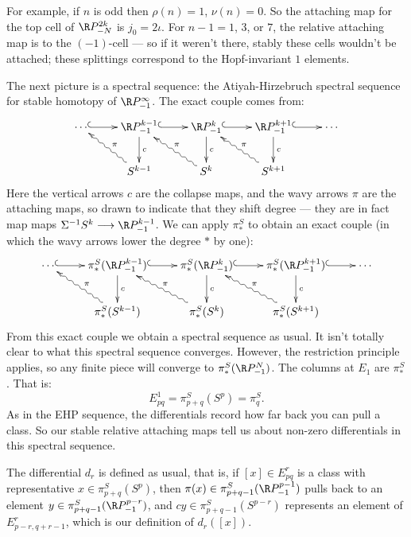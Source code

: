 For example, if $n$ is odd then $\rho(n) = 1$, $\nu(n) = 0$.  So the attaching map for the top cell of $\RP^{2k}_{-N}$ is $j_0 = 2\iota$.  For $n-1 = 1$, $3$, or $7$, the relative attaching map is to the $(-1)$-cell --- so if it weren't there, stably these cells wouldn't be attached; these splittings correspond to the Hopf-invariant $1$ elements.

The next picture is a spectral sequence: the Atiyah-Hirzebruch spectral sequence for stable homotopy of $\RP^\infty_{-1}$.  The exact couple comes from:
\[\xymatrix{
\cdots\ar@{^{(}->}[r]&\RP^{k-1}_{-1}\ar@{^{(}->}[r]\ar[d]^{c}&\RP^{k}_{-1}\ar@{^{(}->}[r]\ar[d]^{c}&\RP^{k+1}_{-1}\ar@{^{(}->}[r]\ar[d]^{c}&\cdots\\
&S^{k-1}\ar@{~>}[ul]_\pi&S^k\ar@{~>}[ul]_\pi&S^{k+1}\ar@{~>}[ul]_\pi
}\]
Here the vertical arrows $c$ are the collapse maps,
and the wavy arrows $\pi$ are the attaching maps, so drawn to indicate that they shift degree --- they are in fact map maps $\Sigma^{-1}S^k\to\RP^{k-1}_{-1}$. We can apply $\pi_*^S$ to obtain an exact couple (in which the wavy arrows lower the degree $*$ by one):
\[\xymatrix{
\cdots\ar@{^{(}->}[r]&\pi_*^S(\RP^{k-1}_{-1})\ar@{^{(}->}[r]\ar[d]^{c}&\pi_*^S(\RP^{k}_{-1})\ar@{^{(}->}[r]\ar[d]^{c}&\pi_*^S(\RP^{k+1}_{-1})\ar@{^{(}->}[r]\ar[d]^{c}&\cdots\\
&\pi_*^S(S^{k-1})\ar@{~>}[ul]_\pi&\pi_*^S(S^k)\ar@{~>}[ul]_\pi&\pi_*^S(S^{k+1})\ar@{~>}[ul]_\pi
}\]
From this exact couple we obtain a spectral sequence as usual. It isn't totally clear to what this spectral sequence converges.  However, the restriction principle applies, so any finite piece will converge to $\pi_*^S (\RP^N_{-1})$. The columns at $E_1$ are $\pi_*^S$. That is:
\[E^1_{pq}=\pi^S_{p+q}(S^p)=\pi^S_q.\]
As in the EHP sequence, the differentials record how far back you can pull a class.  So our stable relative attaching maps tell us about non-zero differentials in this spectral sequence.

The differential $d_r$ is defined as usual, that is, if $[x]\in E_{pq}^r$ is a class with representative $x\in\pi^S_{p+q}(S^p)$, then $\pi(x)\in\pi^S_{p+q-1}(\RP^{p-1}_{-1})$ pulls back to an element $y\in \pi^S_{p+q-1}(\RP^{p-r}_{-1})$, and $cy\in \pi^S_{p+q-1}(S^{p-r})$ represents an element of $E_{p-r,q+r-1}^r$, which is our definition of $d_r([x])$.

